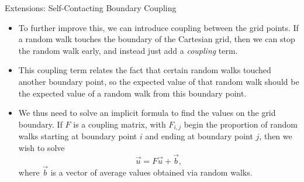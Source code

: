\documentclass{beamer}
\newcommand\mat[1]{#1}
\begin{document}
\begin{frame}{Extensions: Self-Contacting Boundary Coupling}
\begin{itemize}
\item To further improve this,
we can introduce coupling between the grid points.
If a random walk touches the boundary of the Cartesian grid,
then we can stop the random walk early,
and instead just add a \emph{coupling} term.
\item This coupling term relates the fact that certain random walks
touched another boundary point, so the expected value of that random walk
should be the expected value of a random walk from this boundary point.
\item We thus need to solve an implicit formula
to find the values on the grid boundary.
If $\mat{F}$ is a coupling matrix,
with $F_{i,j}$ begin the proportion of random walks
starting at boundary point $i$ and ending at boundary point $j$,
then we wish to solve
$$\vec{u}=\mat{F}\vec{u}+\vec{b},$$
where $\vec{b}$ is a vector of average values obtained via random walks.
\end{itemize}
\end{frame}
\end{document}
